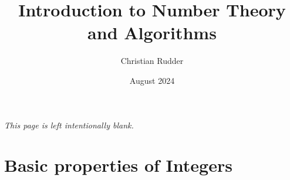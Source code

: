 \documentclass{memoir}
\title{Introduction to Number Theory and Algorithms}
\author{Christian Rudder}
\date{August 2024}
\begin{document}
\maketitle

\tableofcontents

\newpage
\thispagestyle{empty}
\mbox{}
\vfill
\begin{center}
    \textit{This page is left intentionally blank.}
\end{center}
\vfill
\newpage




\chapter{Basic properties of Integers}



\end{document}
